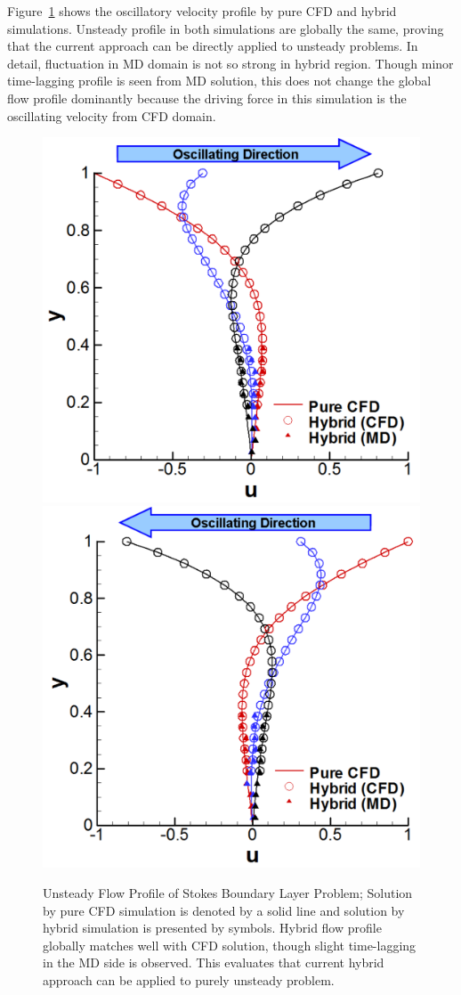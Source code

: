 \documentclass[conference,final]{IEEEtran}
\begin{document}
Figure~\ref{Stokes_Sol} shows the oscillatory velocity profile by pure CFD and hybrid simulations. Unsteady profile in both simulations are globally the same, proving that the current approach can be directly applied to unsteady problems. In detail, fluctuation in MD domain is not so strong in hybrid region. Though minor time-lagging profile is seen from MD solution, this does not change the global flow profile dominantly because the driving force in this simulation is the oscillating velocity from CFD domain.

%
\begin{figure}[ht]
\centering
\includegraphics[width=0.7\linewidth]{Stokes_Sol_1_New.pdf}
\hskip 1cm
\includegraphics[width=0.7\linewidth]{Stokes_Sol_2_New.pdf}
\vskip-0.2cm
\caption{\small Unsteady Flow Profile of Stokes Boundary Layer Problem; Solution by pure CFD simulation is denoted by a solid line and solution by hybrid simulation is presented by symbols. Hybrid flow profile globally matches well with CFD solution, though slight time-lagging in the MD side is observed. This evaluates that current hybrid approach can be applied to purely unsteady problem.}
\label{Stokes_Sol}
\end{figure}
\end{document}
